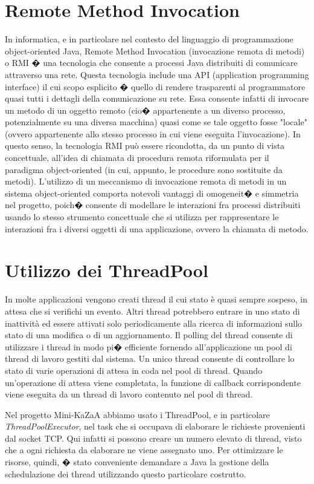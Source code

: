 \section{Remote Method Invocation}
In informatica, e in particolare nel contesto del linguaggio di programmazione object-oriented Java, Remote Method Invocation (invocazione remota di metodi) o RMI � una tecnologia che consente a processi Java distribuiti di comunicare attraverso una rete. Questa tecnologia include una API (application programming interface) il cui scopo esplicito � quello di rendere trasparenti al programmatore quasi tutti i dettagli della comunicazione su rete. Essa consente infatti di invocare un metodo di un oggetto remoto (cio� appartenente a un diverso processo, potenzialmente su una diversa macchina) quasi come se tale oggetto fosse "locale" (ovvero appartenente allo stesso processo in cui viene eseguita l'invocazione). In questo senso, la tecnologia RMI può essere ricondotta, da un punto di vista concettuale, all'idea di chiamata di procedura remota riformulata per il paradigma object-oriented (in cui, appunto, le procedure sono sostituite da metodi).
L'utilizzo di un meccanismo di invocazione remota di metodi in un sistema object-oriented comporta notevoli vantaggi di omogeneit� e simmetria nel progetto, poich� consente di modellare le interazioni fra processi distribuiti usando lo stesso strumento concettuale che si utilizza per rappresentare le interazioni fra i diversi oggetti di una applicazione, ovvero la chiamata di metodo. 

\section{Utilizzo dei ThreadPool}\label{sec:thread_pool}
In molte applicazioni vengono creati thread il cui stato è quasi sempre sospeso, in attesa che si verifichi un evento. Altri thread potrebbero entrare in uno stato di inattività ed essere attivati solo periodicamente alla ricerca di informazioni sullo stato di una modifica o di un aggiornamento. Il polling del thread consente di utilizzare i thread in modo pi� efficiente fornendo all'applicazione un pool di thread di lavoro gestiti dal sistema. Un unico thread consente di controllare lo stato di varie operazioni di attesa in coda nel pool di thread. Quando un'operazione di attesa viene completata, la funzione di callback corrispondente viene eseguita da un thread di lavoro contenuto nel pool di thread.

Nel progetto Mini-KaZaA  abbiamo usato i ThreadPool, e in particolare \emph{ThreadPoolExecutor}, nel task che si occupava di elaborare le richieste provenienti dal socket TCP. Qui infatti si possono creare un numero elevato di thread, visto che a ogni richiesta da elaborare ne viene assegnato uno. Per ottimizzare le risorse, quindi, � stato conveniente demandare a Java la gestione della schedulazione dei thread utilizzando questo particolare costrutto.
